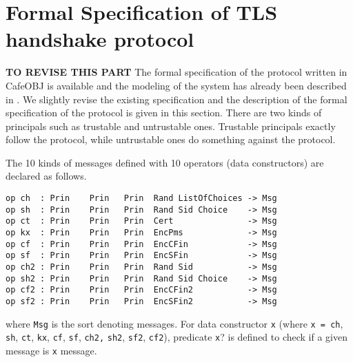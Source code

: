 \documentclass[a4paper,fleqn]{cas-dc}
\begin{document}
\section{Formal Specification of TLS handshake protocol} \label{fstls}
\textbf{TO REVISE THIS PART}
The formal specification of the protocol written in CafeOBJ is available and the modeling of the system has already been described in \cite{1437139}. We slightly revise the existing specification and the description of the formal specification of the protocol is given in this section. There are two kinds of principals such as trustable and untrustable ones. Trustable principals exactly follow the protocol, while untrustable ones do something against the protocol. 


The 10 kinds of messages defined with 10 operators (data constructors) are declared as follows.
\begin{small}
		\begin{verbatim}
op ch  : Prin    Prin   Prin  Rand ListOfChoices -> Msg
op sh  : Prin    Prin   Prin  Rand Sid Choice    -> Msg
op ct  : Prin    Prin   Prin  Cert               -> Msg
op kx  : Prin    Prin   Prin  EncPms             -> Msg
op cf  : Prin    Prin   Prin  EncCFin            -> Msg
op sf  : Prin    Prin   Prin  EncSFin            -> Msg
op ch2 : Prin    Prin   Prin  Rand Sid           -> Msg
op sh2 : Prin    Prin   Prin  Rand Sid Choice    -> Msg
op cf2 : Prin    Prin   Prin  EncCFin2           -> Msg
op sf2 : Prin    Prin   Prin  EncSFin2           -> Msg
		\end{verbatim}
	\end{small}
where \verb!Msg! is the sort denoting messages. For data constructor \verb!x! (where \verb!x = ch!, \verb!sh!, \verb!ct!, \verb!kx!, \verb!cf!, \verb!sf!, \verb!ch2,! \verb!sh2!, \verb!sf2!, \verb!cf2!), predicate \verb!x!? is defined to check if a given message is \verb!x! message.
\end{document}
